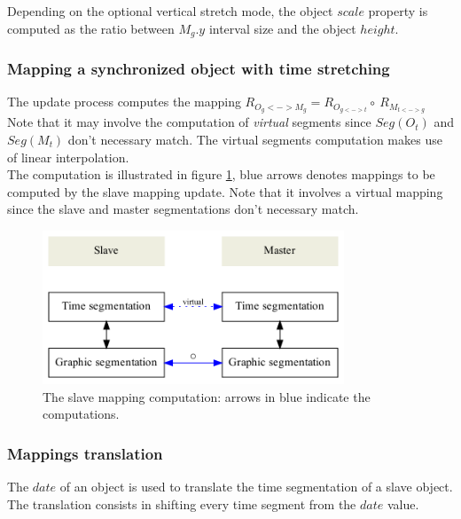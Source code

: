 \documentclass[a4paper]{article}
\newcommand{\seg}[1]		{Seg(#1)}
\begin{document}
Depending on the optional vertical stretch mode, the object $scale$ property is computed as the ratio between $M_{g}.y$ interval size and the object $height$.

\subsubsection{Mapping a synchronized object with time stretching}
The update process computes the mapping $R_{O_{g}<->M_{g}} = R_{O_{g<->t}} \circ\ R_{M_{t<->g}}$\\
Note that it may involve the computation of \emph{virtual} segments since $\seg{O_{t}}$ and $\seg{M_{t}}$ don't necessary match. The virtual segments computation makes use of linear interpolation. \\

The computation is illustrated in figure \ref{slavemap}, blue arrows denotes mappings to be computed by the slave mapping update. Note that it involves a virtual mapping since the slave and master segmentations don't necessary match.

\begin{figure}[h]
	\centering \includegraphics[width=90mm]{rsrc/mappings}
 \caption{The slave mapping computation: arrows in blue indicate the computations.}
 \label{slavemap}
\end{figure}

\subsubsection{Mappings translation}
The $date$ of an object is used to translate the time segmentation of a slave object. The translation consists in shifting every time segment from the $date$ value. 
\end{document}
